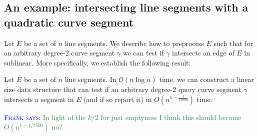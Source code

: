 \documentclass[UKenglish]{lipics-v2019}
\newcommand{\myremark}[4]{\textcolor{blue}{\textsc{#1 #2:}} \textcolor{#4}{\textsf{#3}}}
\newcommand{\frank}[2][says]{\myremark{Frank}{#1}{#2}{SeaGreen}}
\newcommand{\mkmcal}[1]{\ensuremath{\mathcal{#1}}\xspace}
\renewcommand{\O}{\mkmcal{O}}
\begin{document}
\subsection{An example: intersecting line segments with a quadratic
  curve segment}
\label{sub:intersecting_line_segments_with_a_quadratic__curve_segment}

Let $E$ be a set of $n$ line segments. We describe how to preprocess
$E$ such that for an arbitrary degree-2 curve segment $\gamma$ we can
test if $\gamma$ intersects an edge of $E$ in sublinear. More
specifically, we establish the following result:

\begin{lemma}
  \label{lemma:15000}
  Let $E$ be a set of $n$ line segments. In $\O(n\log n)$ time, we can
  construct a linear size data structure that can test if an arbitrary
  degree-2 query curve segment $\gamma$ intersects a segment in $E$
  (and if so report it) in $O(n^{1-\frac{1}{15 000}})$ time.
\end{lemma}
\frank{In light of the $k/2$ for just emptyness I think this should
  become $O(n^{1-1/7500})$ no?}



\end{document}
